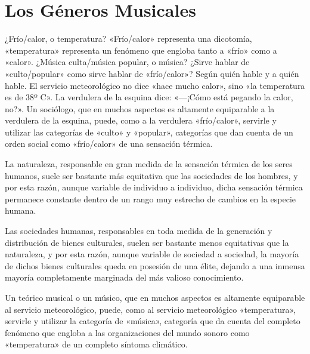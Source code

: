 \chapter {Los Géneros Musicales}
¿Frío/calor, o temperatura? «Frío/calor» representa una dicotomía, «temperatura» representa un fenómeno que engloba tanto a «frío» como a «calor». ¿Música culta/música popular, o música? ¿Sirve hablar de «culto/popular» como sirve hablar de «frío/calor»? Según quién hable y a quién hable. El servicio meteorológico no dice «hace mucho calor», sino «la temperatura es de 38º C». La verdulera de la esquina dice: «---¡Cómo está pegando la calor, no?». Un sociólogo, que en muchos aspectos es altamente equiparable a la verdulera de la esquina, puede, como a la verdulera «frío/calor», servirle y utilizar las categorías de «culto» y «popular», categorías que dan cuenta de un orden social como «frío/calor» de una sensación térmica.

La naturaleza, responsable en gran medida de la sensación térmica de los seres humanos, suele ser bastante más equitativa que las sociedades de los hombres, y por esta razón, aunque variable de individuo a individuo, dicha sensación térmica permanece constante dentro de un rango muy estrecho de cambios en la especie humana.

Las sociedades humanas, responsables en toda medida de la generación y distribución de bienes culturales, suelen ser bastante menos equitativas que la naturaleza, y por esta razón, aunque variable de sociedad a sociedad, la mayoría de dichos bienes culturales queda en posesión de una élite, dejando a una inmensa mayoría completamente marginada del más valioso conocimiento.

Un teórico musical o un músico, que en muchos aspectos es altamente equiparable al servicio meteorológico, puede, como al servicio meteorológico «temperatura», servirle y utilizar la categoría de «música», categoría que da cuenta del completo fenómeno que engloba a las organizaciones del mundo sonoro como «temperatura» de un completo síntoma climático.